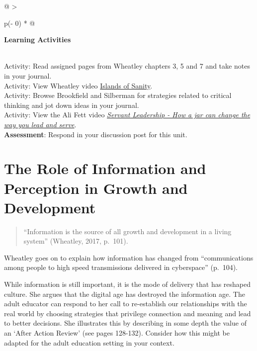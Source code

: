 \documentclass[
]{book}
\begin{document}
\begin{longtable}[]{@{}
  >{\raggedright\arraybackslash}p{(\columnwidth - 0\tabcolsep) * }@{}}
\toprule
\begin{minipage}[b]{\linewidth}\raggedright
\textbf{Learning Activities}
\end{minipage} \\
\midrule
\endhead
Activity: Read assigned pages from Wheatley chapters 3, 5 and 7 and take notes in your journal. \\
Activity: View Wheatley video \href{https://youtu.be/LtaYNxp56gs}{Islands of Sanity}. \\
Activity: Browse Brookfield and Silberman for strategies related to critical thinking and jot down ideas in your journal. \\
Activity: View the Ali Fett video \href{https://youtu.be/1vIPrR_clEg}{\emph{Servant Leadership - How a jar can change the way you lead and serve}}. \\
\textbf{Assessment}: Respond in your discussion post for this unit. \\
\bottomrule
\end{longtable}

\hypertarget{the-role-of-information-and-perception-in-growth-and-development}{%
\section{The Role of Information and Perception in Growth and Development}\label{the-role-of-information-and-perception-in-growth-and-development}}

\begin{quote}
``Information is the source of all growth and development in a living system'' (Wheatley, 2017, p.~101).
\end{quote}

Wheatley goes on to explain how information has changed from ``communications among people to high speed transmissions delivered in cyberspace'' (p.~104).

While information is still important, it is the mode of delivery that has reshaped culture. She argues that the digital age has destroyed the information age. The adult educator can respond to her call to re-establish our relationships with the real world by choosing strategies that privilege connection and meaning and lead to better decisions. She illustrates this by describing in some depth the value of an `After Action Review' (see pages 128-132). Consider how this might be adapted for the adult education setting in your context.
\end{document}
